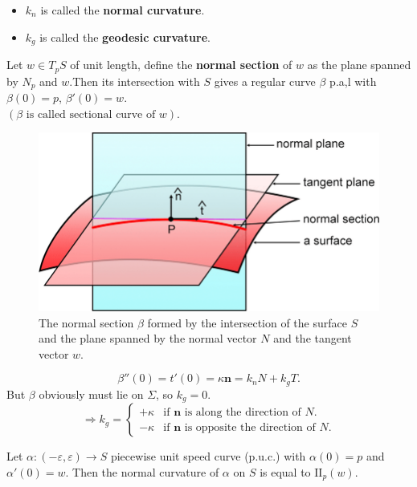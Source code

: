 \documentclass{article}
\begin{document}
\begin{definition}
\begin{itemize}
    \item $k_n$ is called the \textbf{normal curvature}.
    \item $k_g$ is called the \textbf{geodesic curvature}.
\end{itemize}
\end{definition}

\begin{example}
Let $w \in T_p S$ of unit length, define the \textbf{normal section} of $w$ as the plane spanned by $N_p$ and $w$.Then its intersection with $S$ gives a regular curve $\beta$ p.a,l with $\beta(0) = p$, $\beta'(0) = w$.\\
$(\beta \text{ is called sectional curve of } w)$.
\end{example}

\begin{figure}[h!]
    \centering
    \includegraphics[width=0.5\linewidth]{Normal-section.png} %
    \caption{The normal section $\beta$ formed by the intersection of the surface $S$ and the plane spanned by the normal vector $N$ and the tangent vector $w$.}
    \label{fig:normal_section}
\end{figure}


\begin{remark}
$$ \beta''(0) = t'(0) = \kappa \mathbf{n} = k_n N + k_g T. $$
But $\beta$ obviously must lie on $\Sigma$, so $k_g = 0$.
$$ \Rightarrow k_g = \begin{cases} +\kappa & \text{if } \mathbf{n} \text{ is along the direction of } N. \\ -\kappa & \text{if } \mathbf{n} \text{ is opposite the direction of } N. \end{cases} $$
\end{remark}

\begin{proposition}
Let $\alpha: (-\varepsilon, \varepsilon) \to S$ piecewise unit speed curve (p.u.c.) with $\alpha(0) = p$ and $\alpha'(0) = w$.
Then the normal curvature of $\alpha$ on $S$ is equal to $\mathrm{II}_p(w)$.
\end{proposition}
\end{document}
